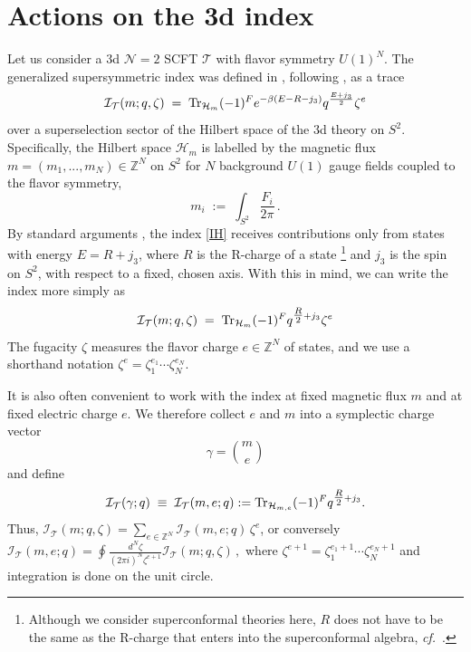 \documentclass[11pt,letterpaper]{article}
\numberwithin{equation}{section}
\newcommand{\be}{\begin{equation}}
\newcommand{\ee}{\end{equation}}
\newcommand{\ds}{\displaystyle}
\newcommand{\cf}{\emph{cf.}}
\newcommand{\Z}{{\mathbb Z}}
\newcommand{\CH}{\mathcal{H}}
\newcommand{\CI}{\mathcal{I}}
\newcommand{\CN}{\mathcal{N}}
\newcommand{\CT}{\mathcal{T}}
\newcommand{\q}{q}
\begin{document}
\section{Actions on the 3d index}
\label{sec:actions}


Let us consider a 3d $\CN=2$ SCFT $\CT$ with flavor symmetry $U(1)^N$. The generalized supersymmetric index was defined in \cite{KW-index}, following \cite{KMMR-index, BBMR-index, Kim-index, IY-index, KSV-index}, as a trace
%
\be \label{IH}
\CI_\CT( m;q,\zeta) \;=\;
{\rm Tr}_{\CH_{ m}} (-1)^Fe^{-\beta(E-R-j_3)}  \q^{\frac{E+j_3}{2}} \zeta^{ e}
\ee
%
over a superselection sector of the Hilbert space of the 3d theory on $S^2$.
Specifically, the Hilbert space $\CH_m$ is labelled by the magnetic flux
$m = (m_1,...,m_N)\in \Z^N$ on $S^2$ for $N$ background $U(1)$ gauge fields coupled to the flavor symmetry,
\be
m_i \; := \; \int_{S^2} \frac{F_i}{2 \pi} \,.
\label{mflux}
\ee
By standard arguments \cite{Witten-constraints}, the index \eqref{IH} receives contributions only from states with energy $E = R + j_3$, where $R$ is the R-charge of a state%
%
\footnote{Although we consider superconformal theories here, $R$ does not have to be the same as the R-charge that enters into the superconformal algebra, \cf\ \cite{IY-index}.} %
%
and $j_3$ is the spin on $S^2$, with respect to a fixed, chosen axis. With this in mind, we can write the index more simply as
%
\be \label{Izeta}
\CI_\CT( m;q,\zeta) \;=\;
{\rm Tr}_{\CH_{ m}} (-1)^F \q^{\tfrac{R}{2} + j_3} \zeta^{ e}
\ee
%
The fugacity $\zeta$ measures the flavor
charge $e\in \Z^N$ of states, and we use a shorthand notation $\zeta^e = \zeta_1^{e_1}\cdots \zeta_N^{e_N}$.

It is also often convenient to work with the index at fixed magnetic flux $m$ and at fixed electric charge $e$.
We therefore collect $e$ and $m$ into a symplectic charge vector
%
\be
\gamma = {m \choose e}
\ee
%
and define
%
\be \label{chargeindex}
\CI_\CT(\gamma;\q)\; \equiv \; \CI_\CT(m,e;\q)
 := {\rm Tr}_{\CH_{m,e}} (-1)^F \q^{\tfrac{R}{2} + j_3}.
\ee
%
Thus, $\ds\CI_\CT(m;q,\zeta) = \sum_{e\in \Z^N}\CI_\CT(m,e;q)\,\zeta^e$, or conversely $\ds \CI_\CT(m,e;q) = {\oint} \frac{d^N\zeta}{(2\pi i)^N
 \zeta^{e+1}} \CI_\CT(m;q,\zeta)\,,$ where $\zeta^{e+1}=\zeta_1^{e_1+1}\cdots\zeta_N^{e_N+1}$ and integration is done on the unit circle.
\end{document}
